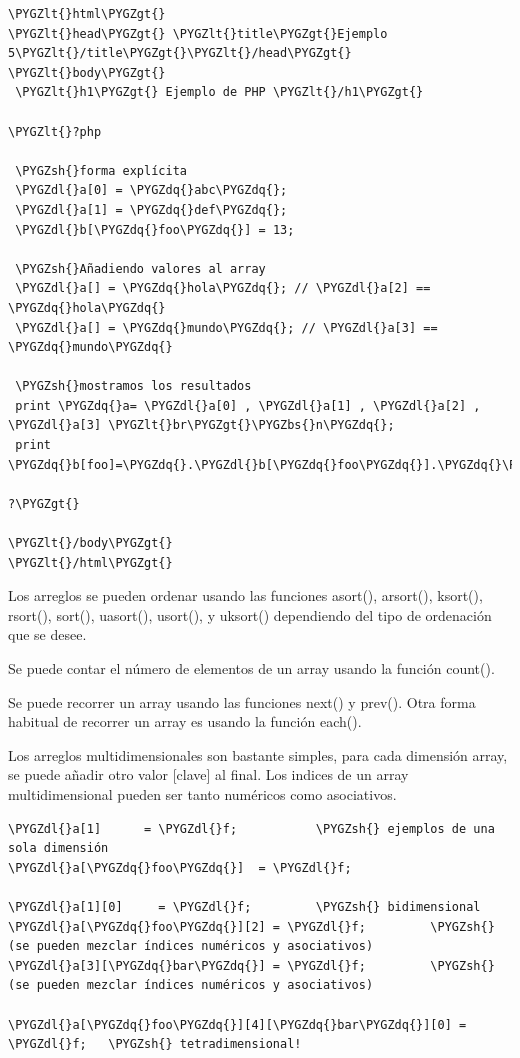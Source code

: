 \documentclass[a5paper,10pt,spanish]{sphinxmanual}
\def\PYGZbs{\char`\\}
\def\PYGZlt{\char`\<}
\def\PYGZgt{\char`\>}
\def\PYGZsh{\char`\#}
\def\PYGZdl{\char`\$}
\def\PYGZdq{\char`\"}
\begin{document}
\begin{Verbatim}[commandchars=\\\{\}]
\PYGZlt{}html\PYGZgt{}
\PYGZlt{}head\PYGZgt{} \PYGZlt{}title\PYGZgt{}Ejemplo 5\PYGZlt{}/title\PYGZgt{}\PYGZlt{}/head\PYGZgt{}
\PYGZlt{}body\PYGZgt{}
 \PYGZlt{}h1\PYGZgt{} Ejemplo de PHP \PYGZlt{}/h1\PYGZgt{}

\PYGZlt{}?php

 \PYGZsh{}forma explícita
 \PYGZdl{}a[0] = \PYGZdq{}abc\PYGZdq{};
 \PYGZdl{}a[1] = \PYGZdq{}def\PYGZdq{};
 \PYGZdl{}b[\PYGZdq{}foo\PYGZdq{}] = 13;

 \PYGZsh{}Añadiendo valores al array
 \PYGZdl{}a[] = \PYGZdq{}hola\PYGZdq{}; // \PYGZdl{}a[2] == \PYGZdq{}hola\PYGZdq{}
 \PYGZdl{}a[] = \PYGZdq{}mundo\PYGZdq{}; // \PYGZdl{}a[3] == \PYGZdq{}mundo\PYGZdq{}

 \PYGZsh{}mostramos los resultados
 print \PYGZdq{}a= \PYGZdl{}a[0] , \PYGZdl{}a[1] , \PYGZdl{}a[2] , \PYGZdl{}a[3] \PYGZlt{}br\PYGZgt{}\PYGZbs{}n\PYGZdq{};
 print \PYGZdq{}b[foo]=\PYGZdq{}.\PYGZdl{}b[\PYGZdq{}foo\PYGZdq{}].\PYGZdq{}\PYGZlt{}br\PYGZgt{}\PYGZbs{}n\PYGZdq{};

?\PYGZgt{}

\PYGZlt{}/body\PYGZgt{}
\PYGZlt{}/html\PYGZgt{}
\end{Verbatim}

Los arreglos se pueden ordenar usando las funciones
asort(),
arsort(),
ksort(),
rsort(),
sort(),
uasort(),
usort(), y
uksort() dependiendo del tipo
de ordenación que se desee.

Se puede contar el número de elementos de un array usando la función
count().

Se puede recorrer un array usando las funciones
next() y
prev(). Otra forma habitual de
recorrer un array es usando la función
each().

Los arreglos multidimensionales son bastante simples, para cada
dimensión array, se puede añadir otro valor {[}clave{]} al final. Los
indices de un array multidimensional pueden ser tanto numéricos como
asociativos.

\begin{Verbatim}[commandchars=\\\{\}]
\PYGZdl{}a[1]      = \PYGZdl{}f;           \PYGZsh{} ejemplos de una sola dimensión
\PYGZdl{}a[\PYGZdq{}foo\PYGZdq{}]  = \PYGZdl{}f;

\PYGZdl{}a[1][0]     = \PYGZdl{}f;         \PYGZsh{} bidimensional
\PYGZdl{}a[\PYGZdq{}foo\PYGZdq{}][2] = \PYGZdl{}f;         \PYGZsh{} (se pueden mezclar índices numéricos y asociativos)
\PYGZdl{}a[3][\PYGZdq{}bar\PYGZdq{}] = \PYGZdl{}f;         \PYGZsh{} (se pueden mezclar índices numéricos y asociativos)

\PYGZdl{}a[\PYGZdq{}foo\PYGZdq{}][4][\PYGZdq{}bar\PYGZdq{}][0] = \PYGZdl{}f;   \PYGZsh{} tetradimensional!
\end{Verbatim}
\end{document}
